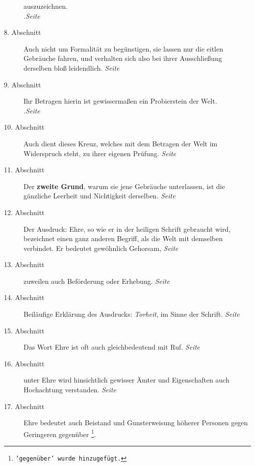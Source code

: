 \begin{description}
auszuzeichnen.\\
.\dotfill \textit{Seite~\pageref{kap9_ab7}}\\
\item[8. Abschnitt] Auch nicht um Formalität zu begünstigen, sie lassen nur die
eitlen Gebräuche fahren, und verhalten sich also bei ihrer Ausschließung
derselben bloß leidendlich.
\dotfill \textit{Seite~\pageref{kap9_ab8}}\\
\item[9. Abschnitt] Ihr Betragen hierin ist gewissermaßen ein Probierstein der
Welt.\\
.\dotfill \textit{Seite~\pageref{kap9_ab9}}\\
\item[10. Abschnitt] Auch dient dieses Kreuz, welches mit dem Betragen der Welt
im Widerspruch steht, zu ihrer eigenen Prüfung.
\dotfill \textit{Seite~\pageref{kap9_ab10}}\\
\item[11. Abschnitt] Der \textbf{zweite Grund}, warum sie jene Gebräuche
unterlassen, ist
die gänzliche Leerheit und Nichtigkeit derselben.
\dotfill \textit{Seite~\pageref{kap9_ab11}}\\
\item[12. Abschnitt] Der Ausdruck: Ehre, so wie er in der heiligen Schrift
gebraucht wird, bezeichnet einen ganz anderen Begriff, als die Welt mit
demselben
verbindet. Er bedeutet gewöhnlich Gehorsam,
\dotfill \textit{Seite~\pageref{kap9_ab12}}\\
\item[13. Abschnitt] zuweilen auch Beförderung oder Erhebung.
\dotfill \textit{Seite~\pageref{kap9_ab13}}\\
\item[14. Abschnitt] Beiläufige Erklärung des Ausdrucks: \textit{Torheit}, im
Sinne
der Schrift.
\dotfill \textit{Seite~\pageref{kap9_ab14}}\\
\item[15. Abschnitt] Das Wort Ehre ist oft auch gleichbedeutend mit Ruf.
\dotfill \textit{Seite~\pageref{kap9_ab15}}\\
\item[16. Abschnitt] unter Ehre wird hinsichtlich gewisser Ämter und
Eigenschaften auch Hochachtung verstanden.
\dotfill \textit{Seite~\pageref{kap9_ab16}}\\
\item[17. Abschnitt] Ehre bedeutet auch Beistand und Gunsterweisung höherer
Personen gegen Geringeren gegenüber
\footnote{\texttt{'gegenüber' wurde hinzugefügt.}}.

\end{description}
